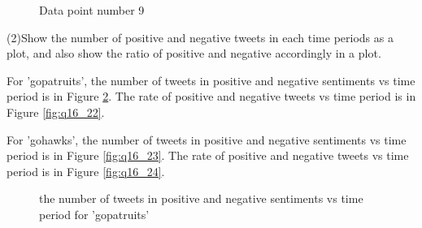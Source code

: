 \documentclass{article}
\begin{document}
\begin{figure}
\centering
{}
\caption{Data point number 9} \label{fig:q1691}
\end{figure}



(2)Show the number of positive and negative tweets in each time periods as a plot, and also show the ratio of positive and negative accordingly in a plot.

For 'gopatruits', the number of tweets in positive and negative sentiments vs time period is in Figure \ref{fig:q16_21}. The rate of positive and negative tweets vs time period is in Figure \ref{fig:q16_22}.

For 'gohawks', the number of tweets in positive and negative sentiments vs time period is in Figure \ref{fig:q16_23}. The rate of positive and negative tweets vs time period is in Figure \ref{fig:q16_24}.\\

\begin{figure}
\centering
{}
\caption{the number of tweets in positive and negative sentiments vs time period for 'gopatruits'} \label{fig:q16_21}
\end{figure}
\end{document}
